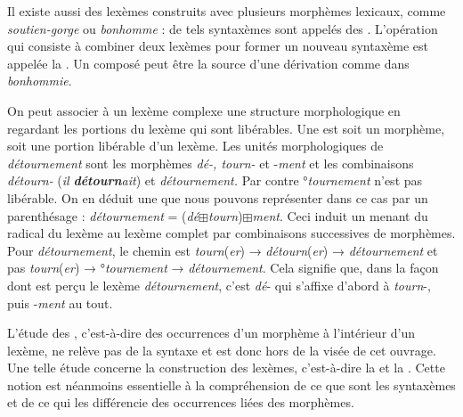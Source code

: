 \begin{sloppypar}
Il existe aussi des lexèmes construits avec plusieurs morphèmes lexicaux, comme \textit{soutien-gorge} ou \textit{bonhomme} : de tels syntaxèmes sont appelés des . L’opération qui consiste à combiner deux lexèmes pour former un nouveau syntaxème est appelée la . Un composé peut être la source d’une dérivation comme dans \textit{bonhommie}.
\end{sloppypar}

On peut associer à un lexème complexe une structure morphologique en regardant les portions du lexème qui sont libérables. Une  est soit un morphème, soit une portion libérable d’un lexème. Les unités morphologiques de \textit{détournement} sont les morphèmes \textit{dé-, tourn-} et -\textit{ment} et les combinaisons \textit{détourn-} (\textit{il} \textbf{\textit{détourn}}\textit{ait}) et \textit{détournement.} Par contre °\textit{tournement} n’est pas libérable. On en déduit une  que nous pouvons représenter dans ce cas par un parenthésage : \textit{détournement} = (\textit{dé}${\boxplus}$\textit{tourn})${\boxplus}$\textit{ment}. Ceci induit un  menant du radical du lexème au lexème complet par combinaisons successives de morphèmes. Pour \textit{détournement}, le chemin est \textit{tourn}(\textit{er}) → \textit{détourn}(\textit{er}) → \textit{détournement} et pas \textit{tourn}(\textit{er}) → °\textit{tournement} → \textit{détournement}. Cela signifie que, dans la façon dont est perçu le lexème \textit{détournement}, c’est \textit{dé}{}- qui s’affixe d’abord à \textit{tourn}{}-, puis -\textit{ment} au tout.

L’étude des , c’est-à-dire des occurrences d’un morphème à l’intérieur d’un lexème, ne relève pas de la syntaxe et est donc hors de la visée de cet ouvrage. Une telle étude concerne la construction des lexèmes, c’est-à-dire la  et la . Cette notion est néanmoins essentielle à la compréhension de ce que sont les syntaxèmes et de ce qui les différencie des occurrences liées des morphèmes.

